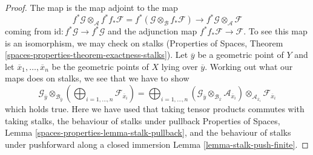 \documentclass[10pt,a4paper]{amsart}
\theoremstyle{plain}
\theoremstyle{definition}
\theoremstyle{remark}
\numberwithin{equation}{subsection}
\begin{document}
\begin{proof}
The map is the map adjoint to the map
$$
f^*\mathcal{G} \otimes_\mathcal{A}
f^* f_*\mathcal{F} =
f^*(\mathcal{G} \otimes_\mathcal{B} f_*\mathcal{F})
\longrightarrow
f^*\mathcal{G} \otimes_\mathcal{A} \mathcal{F}
$$
coming from $\text{id} : f^*\mathcal{G} \to f^*\mathcal{G}$
and the adjunction map $f^* f_*\mathcal{F} \to \mathcal{F}$.
To see this map is an isomorphism, we may check on stalks
(Properties of Spaces, Theorem
\ref{spaces-properties-theorem-exactness-stalks}).
Let $\overline{y}$ be a geometric point of $Y$ and
let $\overline{x}_1, \ldots, \overline{x}_n$ be the geometric
points of $X$ lying over $\overline{y}$.
Working out what our maps does on stalks, we see that we
have to show
$$
\mathcal{G}_{\overline{y}}
\otimes_{\mathcal{B}_{\overline{y}}}
\left(
\bigoplus\nolimits_{i = 1, \ldots, n} \mathcal{F}_{\overline{x}_i}
\right) =
\bigoplus\nolimits_{i = 1, \ldots, n}
(\mathcal{G}_{\overline{y}}
\otimes_{\mathcal{B}_{\overline{x}}}
\mathcal{A}_{\overline{x}_i}) \otimes_{\mathcal{A}_{\overline{x}_i}}
\mathcal{F}_{\overline{x}_i}
$$
which holds true. Here we have used that
taking tensor products commutes with taking stalks, the
behaviour of stalks under pullback
Properties of Spaces, Lemma \ref{spaces-properties-lemma-stalk-pullback}, and
the behaviour of stalks under pushforward along a closed immersion
Lemma \ref{lemma-stalk-push-finite}.
\end{proof}
\end{document}

